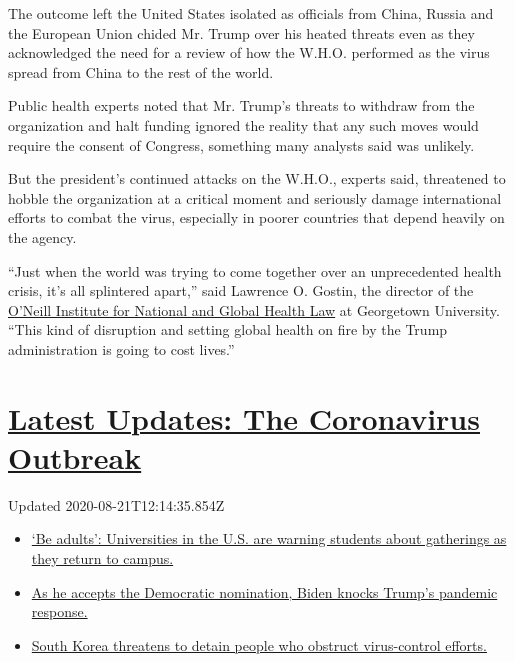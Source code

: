 The outcome left the United States isolated as officials from China,
Russia and the European Union chided Mr. Trump over his heated threats
even as they acknowledged the need for a review of how the W.H.O.
performed as the virus spread from China to the rest of the world.

Public health experts noted that Mr. Trump's threats to withdraw from
the organization and halt funding ignored the reality that any such
moves would require the consent of Congress, something many analysts
said was unlikely.

But the president's continued attacks on the W.H.O., experts said,
threatened to hobble the organization at a critical moment and seriously
damage international efforts to combat the virus, especially in poorer
countries that depend heavily on the agency.

``Just when the world was trying to come together over an unprecedented
health crisis, it's all splintered apart,'' said Lawrence O. Gostin, the
director of the \href{https://oneill.law.georgetown.edu/}{O'Neill
Institute for National and Global Health Law} at Georgetown University.
``This kind of disruption and setting global health on fire by the Trump
administration is going to cost lives.''

\hypertarget{latest-updates-the-coronavirus-outbreak}{%
\section{\texorpdfstring{\href{https://www.nytimes3xbfgragh.onion/2020/08/21/world/covid-19-coronavirus.html?action=click\&pgtype=Article\&state=default\&region=MAIN_CONTENT_1\&context=storylines_live_updates}{Latest
Updates: The Coronavirus
Outbreak}}{Latest Updates: The Coronavirus Outbreak}}\label{latest-updates-the-coronavirus-outbreak}}

Updated 2020-08-21T12:14:35.854Z

\begin{itemize}
\tightlist
\item
  \href{https://www.nytimes3xbfgragh.onion/2020/08/21/world/covid-19-coronavirus.html?action=click\&pgtype=Article\&state=default\&region=MAIN_CONTENT_1\&context=storylines_live_updates\#link-6a60a19d}{`Be
  adults': Universities in the U.S. are warning students about
  gatherings as they return to campus.}
\item
  \href{https://www.nytimes3xbfgragh.onion/2020/08/21/world/covid-19-coronavirus.html?action=click\&pgtype=Article\&state=default\&region=MAIN_CONTENT_1\&context=storylines_live_updates\#link-324af071}{As
  he accepts the Democratic nomination, Biden knocks Trump's pandemic
  response.}
\item
  \href{https://www.nytimes3xbfgragh.onion/2020/08/21/world/covid-19-coronavirus.html?action=click\&pgtype=Article\&state=default\&region=MAIN_CONTENT_1\&context=storylines_live_updates\#link-191d44be}{South
  Korea threatens to detain people who obstruct virus-control efforts.}
\end{itemize}

